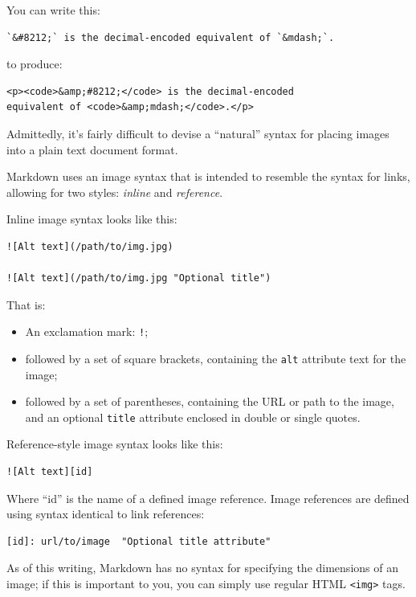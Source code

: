 You can write this:

\begin{verbatim}
`&#8212;` is the decimal-encoded equivalent of `&mdash;`.
\end{verbatim}

to produce:

\begin{verbatim}
<p><code>&amp;#8212;</code> is the decimal-encoded
equivalent of <code>&amp;mdash;</code>.</p>
\end{verbatim}

Admittedly, it's fairly difficult to devise a ``natural'' syntax for
placing images into a plain text document format.

Markdown uses an image syntax that is intended to resemble the syntax
for links, allowing for two styles: \emph{inline} and \emph{reference}.

Inline image syntax looks like this:

\begin{verbatim}
![Alt text](/path/to/img.jpg)

![Alt text](/path/to/img.jpg "Optional title")
\end{verbatim}

That is:

\begin{itemize}
\item An exclamation mark: \texttt{!};
\item followed by a set of square brackets, containing the \texttt{alt}
attribute text for the image;
\item followed by a set of parentheses, containing the URL or path to
the image, and an optional \texttt{title} attribute enclosed in double
or single quotes.
\end{itemize}

Reference-style image syntax looks like this:

\begin{verbatim}
![Alt text][id]
\end{verbatim}

Where ``id'' is the name of a defined image reference. Image references
are defined using syntax identical to link references:

\begin{verbatim}
[id]: url/to/image  "Optional title attribute"
\end{verbatim}

As of this writing, Markdown has no syntax for specifying the
dimensions of an image; if this is important to you, you can simply
use regular HTML \texttt{<img>} tags.

